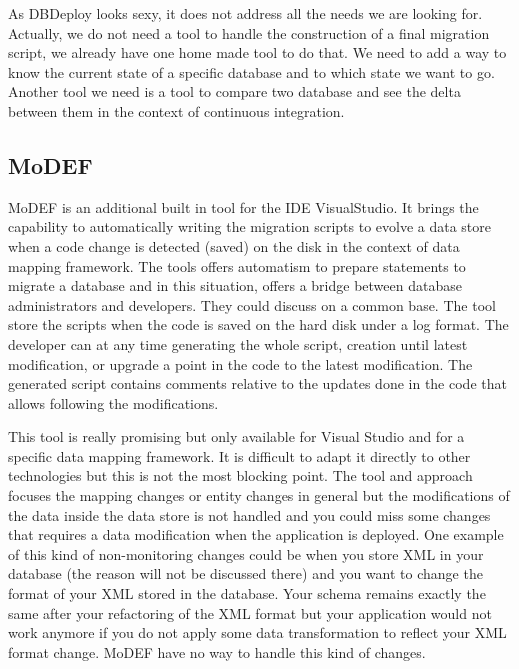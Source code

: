 As DBDeploy looks sexy, it does not address all the needs we are looking for. Actually, we do not need a tool to handle the construction of a final migration script, we already have one home made tool to do that. We need to add a way to know the current state of a specific database and to which state we want to go. Another tool we need is a tool to compare two database and see the delta between them in the context of continuous integration. 

\subsection{MoDEF}

MoDEF\cite{Terwilliger:2010:WDU:1807167.1807316} is an additional built in tool for the IDE\cite{ide} VisualStudio. It brings the capability to automatically writing the migration scripts to evolve a data store when a code change is detected (saved) on the disk in the context of data mapping framework. The tools offers automatism to prepare statements to migrate a database and in this situation, offers a bridge between database administrators and developers. They could discuss on a common base. The tool store the scripts when the code is saved on the hard disk under a log format. The developer can at any time generating the whole script, creation until latest modification, or upgrade a point in the code to the latest modification. The generated script contains comments relative to the updates done in the code that allows following the modifications.

This tool is really promising but only available for Visual Studio and for a specific data mapping framework. It is difficult to adapt it directly to other technologies but this is not the most blocking point. The tool and approach focuses the mapping changes or entity changes in general but the modifications of the data inside the data store is not handled and you could miss some changes that requires a data modification when the application is deployed. One example of this kind of non-monitoring changes could be when you store XML\cite{xml} in your database (the reason will not be discussed there) and you want to change the format of your XML stored in the database. Your schema remains exactly the same after your refactoring of the XML format but your application would not work anymore if you do not apply some data transformation to reflect your XML format change. MoDEF have no way to handle this kind of changes.

